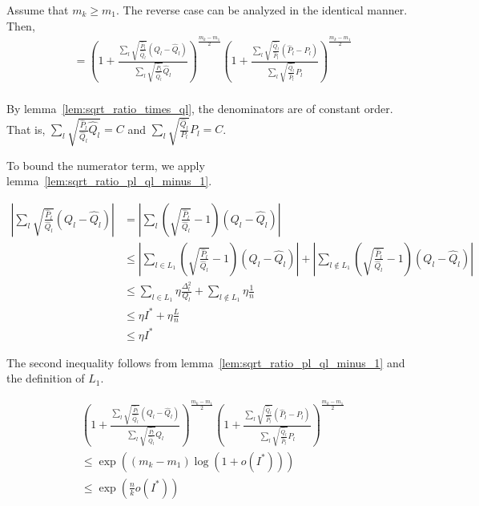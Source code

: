 \documentclass{article}
\begin{document}
Assume that $m_k \geq m_1$. The reverse case can be analyzed in the identical manner. Then,
\begin{align*}
&= \left( 1 + 
   \frac{\sum_l \sqrt{\frac{\hat{P}_l}{\hat{Q}_l}} (Q_l - \hat{Q}_l)}
        {\sum_l \sqrt{\frac{\hat{P}_l}{\hat{Q}_l}} \hat{Q}_l} 
     \right)^{\frac{m_k - m_1}{2}} 
   \left( 1+ \frac{\sum_l \sqrt{\frac{\hat{Q}_l}{\hat{P}_l}} (\hat{P}_l - P_l)}
         {\sum_l \sqrt{\frac{\hat{Q}_l}{\hat{P}_l}} P_l } \right)^{\frac{m_k - m_1}{2}} 
   \\
\end{align*}

By lemma~\ref{lem:sqrt_ratio_times_ql}, the denominators are of constant order. That is, 
$\sum_l \sqrt{ \frac{ \hat{P}_l }{ \hat{Q}_l } \hat{Q}_l } = C$ and 
$\sum_l \sqrt{ \frac{\hat{Q}_l}{P_l} } P_l = C$. 

To bound the numerator term, we apply lemma~\ref{lem:sqrt_ratio_pl_ql_minus_1}. 

\begin{align*}
\left| \sum_l \sqrt{\frac{\hat{P}_l}{\hat{Q}_l}} (Q_l - \hat{Q}_l) \right|  &= 
  \left|  \sum_l \left( \sqrt{\frac{\hat{P}_l}{\hat{Q}_l}} -1 \right) (Q_l - \hat{Q}_l) 
 \right| \\
& \leq \left| \sum_{l \in L_1} \left( \sqrt{\frac{\hat{P}_l}{\hat{Q}_l}} -1 \right) (Q_l - \hat{Q}_l) \right| +  %
  \left| \sum_{l \notin L_1} \left( \sqrt{\frac{\hat{P}_l}{\hat{Q}_l}} -1 \right) (Q_l - \hat{Q}_l) \right| \\
& \leq \sum_{l \in L_1} \eta \frac{\Delta_l^2}{Q_l} + \sum_{l \notin L_1} \eta \frac{1}{n} \\
& \leq \eta I^* + \eta \frac{L}{n}  \\
& \leq \eta I^*  
\end{align*}

The second inequality follows from lemma~\ref{lem:sqrt_ratio_pl_ql_minus_1} and the definition of $L_1$. 

\begin{align*}
& \left( 1 + 
   \frac{\sum_l \sqrt{\frac{\hat{P}_l}{\hat{Q}_l}} (Q_l - \hat{Q}_l)}
        {\sum_l \sqrt{\frac{\hat{P}_l}{\hat{Q}_l}} \hat{Q}_l} 
     \right)^{\frac{m_k - m_1}{2}} 
   \left( 1+ \frac{\sum_l \sqrt{\frac{\hat{Q}_l}{\hat{P}_l}} (\hat{P}_l - P_l)}
         {\sum_l \sqrt{\frac{\hat{Q}_l}{\hat{P}_l}} P_l } \right)^{\frac{m_k - m_1}{2}} 
\\
&\leq \exp\left( (m_k - m_1) \log(1 + o(I^*) ) \right) \\
&\leq \exp \left( \frac{n}{k} o(I^*) \right) 
\end{align*}
\end{document}
